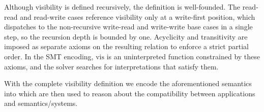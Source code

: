    Although visibility is defined
  recursively, the definition is well-founded. The read-read and read-write cases
  reference visibility only at a write-first position, which dispatches to the
  non-recursive write-read and write-write base cases in a single step, so the
  recursion depth is bounded by one. Acyclicity and transitivity are imposed as
  separate axioms on the resulting relation to enforce a strict partial order. In
  the SMT encoding, $\text{vis}$ is an uninterpreted function constrained by these
  axioms, and the solver searches for interpretations that satisfy them.

  With the complete visibility definition we encode the aforementioned semantics
  into \sysname{} which are then used to reason about the compatibility
  between applications and semantics/systems.


